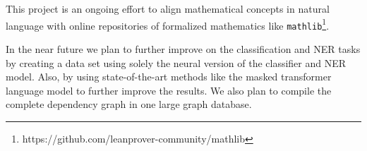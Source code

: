 \documentclass[11pt,a4paper]{article}
\begin{document}
This project is an ongoing effort to align mathematical concepts
in natural language with  online repositories of formalized
mathematics like
\texttt{mathlib}\footnote{https://github.com/leanprover-community/mathlib}. 

In the near future we plan to further improve on the classification 
and NER tasks by creating a data set using solely the neural version
of the classifier and NER model. Also,  by using state-of-the-art
methods like the masked transformer language model \cite{bert} to
further improve the results. 
We also plan to compile the complete dependency graph in one 
large graph database. 





\end{document}
